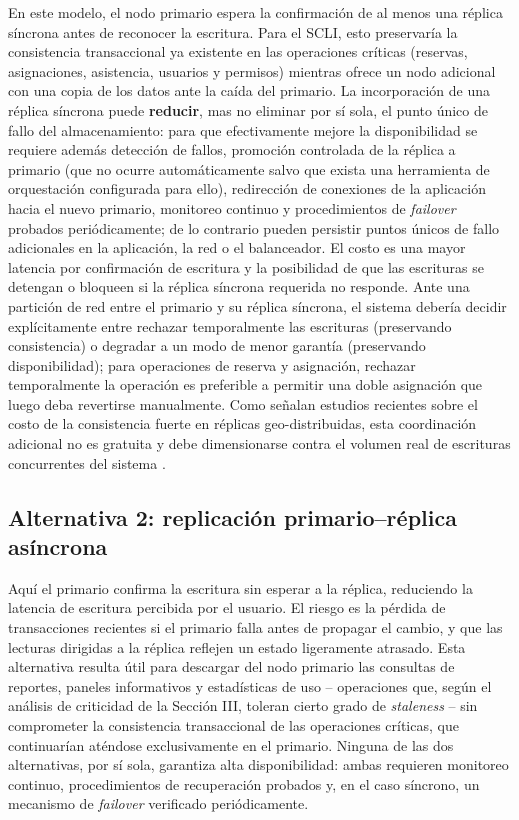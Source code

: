 \documentclass[conference]{IEEEtran}
\begin{document}
En este modelo, el nodo primario espera la confirmaci\'on de al menos una r\'eplica s\'incrona antes de reconocer la escritura. Para el SCLI, esto preservar\'ia la consistencia transaccional ya existente en las operaciones cr\'iticas (reservas, asignaciones, asistencia, usuarios y permisos) mientras ofrece un nodo adicional con una copia de los datos ante la ca\'ida del primario. La incorporaci\'on de una r\'eplica s\'incrona puede \textbf{reducir}, mas no eliminar por s\'i sola, el punto \'unico de fallo del almacenamiento: para que efectivamente mejore la disponibilidad se requiere adem\'as detecci\'on de fallos, promoci\'on controlada de la r\'eplica a primario (que no ocurre autom\'aticamente salvo que exista una herramienta de orquestaci\'on configurada para ello), redirecci\'on de conexiones de la aplicaci\'on hacia el nuevo primario, monitoreo continuo y procedimientos de \emph{failover} probados peri\'odicamente; de lo contrario pueden persistir puntos \'unicos de fallo adicionales en la aplicaci\'on, la red o el balanceador. El costo es una mayor latencia por confirmaci\'on de escritura y la posibilidad de que las escrituras se detengan o bloqueen si la r\'eplica s\'incrona requerida no responde. Ante una partici\'on de red entre el primario y su r\'eplica s\'incrona, el sistema deber\'ia decidir expl\'icitamente entre rechazar temporalmente las escrituras (preservando consistencia) o degradar a un modo de menor garant\'ia (preservando disponibilidad); para operaciones de reserva y asignaci\'on, rechazar temporalmente la operaci\'on es preferible a permitir una doble asignaci\'on que luego deba revertirse manualmente. Como se\~nalan estudios recientes sobre el costo de la consistencia fuerte en r\'eplicas geo-distribuidas, esta coordinaci\'on adicional no es gratuita y debe dimensionarse contra el volumen real de escrituras concurrentes del sistema \cite{du2023}.

\subsection{Alternativa 2: replicaci\'on primario--r\'eplica as\'incrona}

Aqu\'i el primario confirma la escritura sin esperar a la r\'eplica, reduciendo la latencia de escritura percibida por el usuario. El riesgo es la p\'erdida de transacciones recientes si el primario falla antes de propagar el cambio, y que las lecturas dirigidas a la r\'eplica reflejen un estado ligeramente atrasado. Esta alternativa resulta \'util para descargar del nodo primario las consultas de reportes, paneles informativos y estad\'isticas de uso -- operaciones que, seg\'un el an\'alisis de criticidad de la Secci\'on III, toleran cierto grado de \emph{staleness} -- sin comprometer la consistencia transaccional de las operaciones cr\'iticas, que continuar\'ian at\'endose exclusivamente en el primario. Ninguna de las dos alternativas, por s\'i sola, garantiza alta disponibilidad: ambas requieren monitoreo continuo, procedimientos de recuperaci\'on probados y, en el caso s\'incrono, un mecanismo de \emph{failover} verificado peri\'odicamente.
\end{document}
